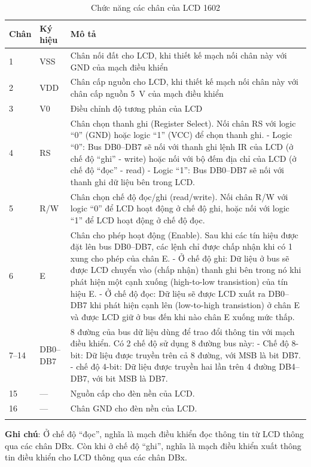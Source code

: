 \begin{longtable}{l l p{}} \toprule
Chân & Ký hiệu & Mô tả \\
\midrule
\endhead
1 & VSS & Chân nối đất cho LCD, khi thiết kế mạch nối chân này với GND của mạch điều khiển \\ \midrule
2 & VDD & Chân cấp nguồn cho LCD, khi thiết kế mạch nối chân này với chân cấp nguồn \si{5\volt} của mạch điều khiển \\ \midrule
3 & V0 & Điều chỉnh độ tương phản của LCD \\ \midrule
4 & RS & Chân chọn thanh ghi (Register Select). Nối chân RS với logic ``0'' (GND) hoặc logic ``1'' (VCC) để chọn thanh ghi.\newline
- Logic ``0'': Bus DB0--DB7 sẽ nối với thanh ghi lệnh IR của LCD (ở chế độ ``ghi'' - write) hoặc nối với bộ đếm địa chỉ của LCD (ở chế độ ``đọc'' - read)\newline
- Logic ``1'': Bus DB0--DB7 sẽ nối với thanh ghi dữ liệu bên trong LCD. \\ \midrule
5 & R/W & Chân chọn chế độ đọc/ghi (read/write). Nối chân R/W với logic ``0'' để LCD hoạt động ở chế độ ghi, hoặc nối với logic ``1'' để LCD hoạt động ở chế độ đọc. \\ \midrule
6 & E & Chân cho phép hoạt động (Enable). Sau khi các tín hiệu được đặt lên bus DB0--DB7, các lệnh chỉ được chấp nhận khi có 1 xung cho phép của chân E.\newline
- Ở chế độ ghi: Dữ liệu ở bus sẽ được LCD chuyển vào (chấp nhận) thanh ghi bên trong nó khi phát hiện một cạnh xuống (high-to-low transistion) của tín hiệu E.\newline
- Ở chế độ đọc: Dữ liệu sẽ được LCD xuất ra DB0--DB7 khi phát hiện cạnh lên (low-to-high transistion) ở chân E và được LCD giữ ở bus đến khi nào chân E xuống mức thấp. \\ \midrule
7--14 & DB0--DB7 & 8 đường của bus dữ liệu dùng để trao đổi thông tin với mạch điều khiển. Có 2 chế độ sử dụng 8 đường bus này:\newline
- Chế độ 8-bit: Dữ liệu được truyền trên cả 8 đường, với MSB là bit DB7.\newline
- chế độ 4-bit: Dữ liệu được truyền hai lần trên 4 đường DB4--DB7, với bit MSB là DB7. \\ \midrule
15 & --- & Nguồn cấp cho đèn nền của LCD. \\ \midrule
16 & --- & Chân GND cho đèn nền của LCD. \\
\bottomrule
\caption{Chức năng các chân của LCD 1602}
\end{longtable}
\textbf{Ghi chú}:\newline
Ở chế độ ``đọc'', nghĩa là mạch điều khiển đọc thông tin từ LCD thông qua các chân DBx.
Còn khi ở chế độ ``ghi'', nghĩa là mạch điều khiển xuất thông tin điều khiển cho LCD thông qua các chân DBx.

